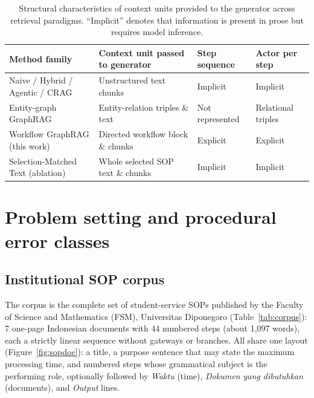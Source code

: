 \documentclass[preprint,10pt]{elsarticle}
\begin{document}
\begin{table}[!htbp]
\centering
\caption{Structural characteristics of context units provided to the generator across retrieval paradigms. ``Implicit'' denotes that information is present in prose but requires model inference.}
\label{tab:positioning}
\small
\begin{tabularx}{\textwidth}{>{\raggedright\arraybackslash}p{3.2cm} >{\raggedright\arraybackslash}X >{\raggedright\arraybackslash}p{2.1cm} >{\raggedright\arraybackslash}p{2.1cm}}
\toprule
Method family & Context unit passed to generator & Step sequence & Actor per step \\
\midrule
Naive / Hybrid / Agentic / CRAG \cite{lewis2020rag,cormack2009rrf,yao2023react,yan2024crag} & Unstructured text chunks & Implicit & Implicit \\
Entity-graph GraphRAG \cite{edge2024graphrag,guo2024lightrag} & Entity-relation triples \& text & Not represented & Relational triples \\
Workflow GraphRAG (this work) & Directed workflow block \& chunks & Explicit & Explicit \\
Selection-Matched Text (ablation) & Whole selected SOP text \& chunks & Implicit & Implicit \\
\bottomrule
\end{tabularx}
\end{table}

\section{Problem setting and procedural error classes}
\label{sec:problem}

\subsection{Institutional SOP corpus}
The corpus is the complete set of student-service SOPs published by the Faculty of Science and Mathematics (FSM), Universitas Diponegoro (Table~\ref{tab:corpus}): 7 one-page Indonesian documents with 44 numbered steps (about 1,097 words), each a strictly linear sequence without gateways or branches. All share one layout (Figure~\ref{fig:sopdoc}): a title, a purpose sentence that may state the maximum processing time, and numbered steps whose grammatical subject is the performing role, optionally followed by \emph{Waktu} (time), \emph{Dokumen yang dibutuhkan} (documents), and \emph{Output} lines.
\end{document}
